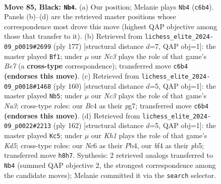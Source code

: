 \documentclass[11pt]{article}
\begin{document}
\clearpage

\begin{figure}[p]\centering
\begin{subfigure}{0.46\textwidth}\centering
\resizebox{\linewidth}{!}{%
\newchessgame
\chessboard[
  setfen={7k/8/2n5/8/2b2B2/7K/5P2/8 b - - 16 85},
  showmover=false,
  pgfstyle=straightmove, color=movearrow, markmove={c6-b4}
]}
\caption{}
\end{subfigure}\hfill
\begin{subfigure}{0.46\textwidth}\centering
\resizebox{\linewidth}{!}{%
\newchessgame
\chessboard[
  setfen={8/8/8/8/B2k4/P7/3Kb3/8 b - - 0 89},
  showmover=false,
  pgfstyle=straightmove, color=movearrow, markmove={e2-f1}
]}
\caption{}
\end{subfigure}
\\[4pt]
\begin{subfigure}{0.46\textwidth}\centering
\resizebox{\linewidth}{!}{%
\newchessgame
\chessboard[
  setfen={8/6p1/8/3b4/6k1/N3K3/8/8 w - - 8 81},
  showmover=false,
  pgfstyle=straightmove, color=movearrow, markmove={a3-b5}
]}
\caption{}
\end{subfigure}\hfill
\begin{subfigure}{0.46\textwidth}\centering
\resizebox{\linewidth}{!}{%
\newchessgame
\chessboard[
  setfen={8/7b/8/1p1K4/1P6/6B1/8/k7 w - - 40 82},
  showmover=false,
  pgfstyle=straightmove, color=movearrow, markmove={d5-c5}
]}
\caption{}
\end{subfigure}
\caption{\textbf{Move 85, Black: \texttt{Nb4}.} (a) Our position; Melanie plays \texttt{Nb4} (\texttt{c6b4}). Panels (b)--(d) are the retrieved master positions whose correspondence most drove this move (highest QAP objective among those that transfer to it). (b) Retrieved from \texttt{lichess\_elite\_2024-09\_p0019\#2699} (ply 177) [structural distance $d$=7, QAP obj=1]: the master played \texttt{Bf1}; under $\mu$ our \emph{Nc3} plays the role of that game's \emph{Be7} (a \textbf{cross-type} correspondence); transferred move \texttt{c6b4} \textbf{(endorses this move)}. (c) Retrieved from \texttt{lichess\_elite\_2024-09\_p0018\#1468} (ply 160) [structural distance $d$=5, QAP obj=1]: the master played \texttt{Nb5}; under $\mu$ our \emph{Nc3} plays the role of that game's \emph{Na3}; cross-type roles: our \emph{B}c4 as their \emph{p}g7; transferred move \texttt{c6b4} \textbf{(endorses this move)}. (d) Retrieved from \texttt{lichess\_elite\_2024-09\_p0022\#2213} (ply 162) [structural distance $d$=5, QAP obj=1]: the master played \texttt{Kc5}; under $\mu$ our \emph{Kh1} plays the role of that game's \emph{Kd5}; cross-type roles: our \emph{N}c6 as their \emph{P}b4, our \emph{b}f4 as their \emph{p}b5; transferred move \texttt{h8h7}. Synthesis: 2 retrieved analogs transferred to \texttt{Nb4} (summed QAP objective 2, the strongest correspondence among the candidate moves); Melanie committed it via the \texttt{search} selector.}
\label{fig:thought-m169}
\end{figure}
\end{document}
